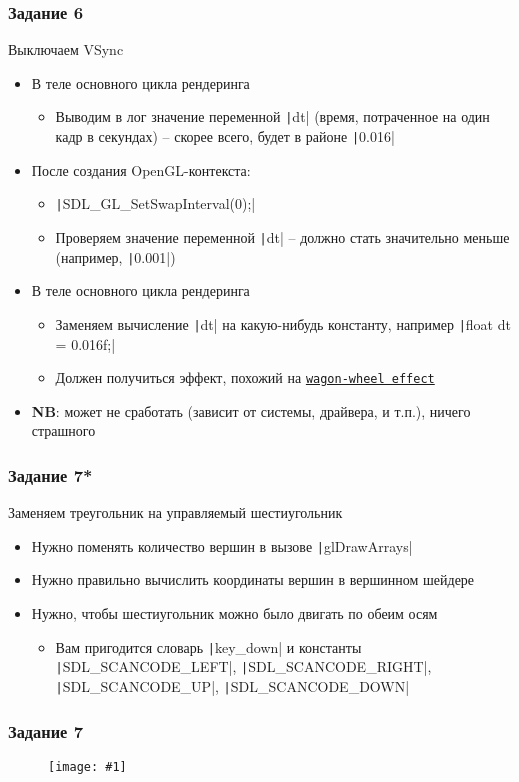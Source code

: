\documentclass[10pt]{beamer}
\newcommand{\slideimage}[1]{
  \begin{figure}
    \begin{adjustbox}{width=\textwidth, totalheight=\textheight-2\baselineskip-2\baselineskip,keepaspectratio}
      \texttt{[image: \#1]}
    \end{adjustbox}
  \end{figure}
}
\begin{document}
\begin{frame}[fragile]
\frametitle{Задание 6}
Выключаем VSync
\begin{itemize}
\item В теле основного цикла рендеринга
\begin{itemize}
\item Выводим в лог значение переменной \texttt|dt| (время, потраченное на один кадр в секундах) -- скорее всего, будет в районе \texttt|0.016|
\end{itemize}
\item После создания OpenGL-контекста:
\begin{itemize}
\item \texttt|SDL_GL_SetSwapInterval(0);|
\item Проверяем значение переменной \texttt|dt| -- должно стать значительно меньше (например, \texttt|0.001|)
\end{itemize}
\item В теле основного цикла рендеринга
\begin{itemize}
\item Заменяем вычисление \texttt|dt| на какую-нибудь константу, например \texttt|float dt = 0.016f;|
\item Должен получиться эффект, похожий на \href{https://en.wikipedia.org/wiki/Wagon-wheel_effect}{\texttt{wagon-wheel effect}}
\end{itemize}
\item \textbf{\alert{NB}}: может не сработать (зависит от системы, драйвера, и т.п.), ничего страшного
\end{itemize}
\end{frame}

\begin{frame}[fragile]
\frametitle{Задание 7*}
Заменяем треугольник на управляемый шестиугольник
\begin{itemize}
\item Нужно поменять количество вершин в вызове \texttt|glDrawArrays|
\item Нужно правильно вычислить координаты вершин в вершинном шейдере
\item Нужно, чтобы шестиугольник можно было двигать по обеим осям
\begin{itemize}
\item Вам пригодится словарь \texttt|key_down| и константы \texttt|SDL_SCANCODE_LEFT|, \texttt|SDL_SCANCODE_RIGHT|, \texttt|SDL_SCANCODE_UP|, \texttt|SDL_SCANCODE_DOWN|
\end{itemize}
\end{itemize}
\end{frame}

\begin{frame}
\frametitle{Задание 7}
\slideimage{7.png}
\end{frame}
\end{document}
